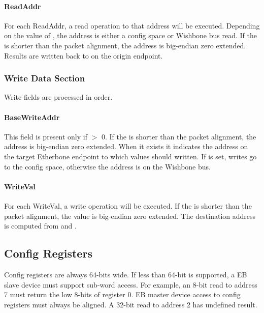 \documentclass{article}
\begin{document}
\paragraph{ReadAddr} \label{field:ReadAddr}
For each ReadAddr, 
a read operation to that address will be executed.
Depending on the value of ,
the address is either a config space or Wishbone bus read.
If the  is shorter than the packet alignment, 
the address is big-endian zero extended.
Results are written back to  on the origin endpoint.

\subsubsection{Write Data Section}

Write fields are processed in order.

\paragraph{BaseWriteAddr} \label{field:BaseWriteAddr}
This field is present only if  $>$ 0.
If the  is shorter than the packet alignment, 
the address is big-endian zero extended.
When it exists it indicates the address on the target Etherbone endpoint 
to which values should written.
If  is set,
writes go to the config space,
otherwise the address is on the Wishbone bus.

\paragraph{WriteVal} \label{field:WriteVal}
For each WriteVal, 
a write operation will be executed.
If the  is shorter than the packet alignment, 
the value is big-endian zero extended.
The destination address is computed from  and 
.


\subsection{Config Registers}
\label{sec:config}

Config registers are always 64-bits wide.
If  less than 64-bit is supported,
a EB slave device must support sub-word access.
For example, an 8-bit read to address 7 must return the
low 8-bits of register 0.
EB master device access to config registers must always be aligned.
A 32-bit read to address 2 has undefined result.
\end{document}
